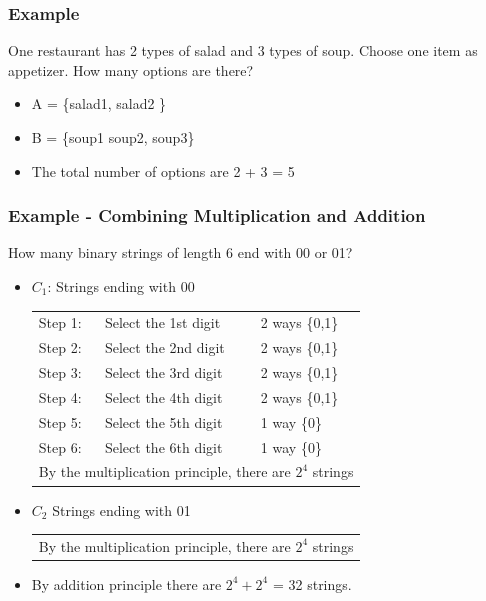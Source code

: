 \documentclass[12pt, letterpaper]{article}
\begin{document}
\subsubsection*{Example}
One restaurant has 2 types of salad and 3 types of soup. Choose one item as appetizer. How many options are there?
\begin{itemize}[leftmargin=*, label={}]
	\item A = \{salad1, salad2 \} 
	\item B = \{soup1 soup2, soup3\}
	\item The total number of options are 2 + 3 = 5
\end{itemize}


\subsubsection*{Example - Combining Multiplication and Addition}
How many binary strings of length 6 end with 00 or 01? 
\begin{itemize}[leftmargin=*, label={}]
	\item $C_1$: Strings ending with 00 \\
	\begin{tabular}{l l l}
		Step 1: & Select the 1st digit & 2 ways \{0,1\} \\  
		Step 2: & Select the 2nd digit & 2 ways \{0,1\} \\
		Step 3: & Select the 3rd digit & 2 ways \{0,1\} \\
		Step 4: & Select the 4th digit & 2 ways \{0,1\} \\
		Step 5: & Select the 5th digit & 1 way \{0\} \\
		Step 6: & Select the 6th digit & 1 way \{0\} \\
		\multicolumn{3}{l}{By the multiplication principle, there are $2^4$ strings}
	\end{tabular}
	\item $C_2$ Strings ending with 01 \\ 
	\begin{tabular}{l l l}
		\multicolumn{3}{l}{By the multiplication principle, there are $2^4$ strings}
	\end{tabular}
	\item By addition principle there are $2^4 + 2^4$ = 32 strings.
\end{itemize}

\pagebreak
\end{document}
